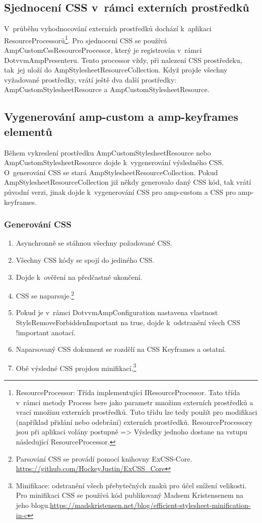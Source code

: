 \subsection*{Sjednocení CSS v~rámci externích prostředků}
V~průběhu vyhodnocování externích prostředků dochází k~aplikaci ResourceProcessorů\footnote{ResourceProcessor: Třída implementující IResourceProcessor. Tato třída v~rámci metody Process bere jako parametr množinu externích prostředků a vrací množinu externích prostředků. Tuto třídu lze tedy použít pro modifikaci (například přidání nebo odebrání) externích prostředků. ResourceProcessory jsou při aplikaci volány postupně => Výsledky jednoho dostane na vstupu následující ResourceProcessor.}. Pro sjednocení CSS se používá AmpCustomCssResourceProcessor, který je registrován v~rámci DotvvmAmpPresenteru. Tento processor vždy, při nalezení CSS prostředeku, tak~jej uloží do AmpStylesheetResourceCollection. Když projde všechny vyžadované prostředky, vrátí ještě dva další prostředky: AmpCustomStylesheetResource a AmpCustomStylesheetResource.

\subsection*{Vygenerování amp-custom a amp-keyframes elementů}
Během vykreslení prostředku AmpCustomStylesheetResource nebo AmpCustomStylesheetResource dojde k~vygenerování výsledného CSS. O~generování CSS se stará AmpStylesheetResourceCollection. Pokud AmpStylesheetResourceCollection již někdy generovalo daný CSS kód, tak vrátí původní verzi, jinak dojde k~vygenerování CSS pro amp-custom a CSS  pro amp-keyframes.

\subsubsection*{Generování CSS}
\begin{enumerate}
  \setlength{\itemsep}{14pt}%
    \item Asynchronně se stáhnou všechny požadované CSS.
    \item Všechny CSS kódy se spojí do jediného CSS.
    \item Dojde k~ověření na předčastné ukončení.
    \item CSS se naparsuje.\footnote{Parsování CSS se provádí pomocí knihovny ExCSS-Core. \newline \url{https://github.com/HockeyJustin/ExCSS_Core}}
    \item Pokud je v~rámci DotvvmAmpConfiguration nastavena vlastnost StyleRemoveForbiddenImportant na true, dojde k~odstranění všech CSS !important anotací. 
    \item Naparsovaný CSS dokument se rozdělí na CSS Keyframes a ostatní.
    \item Obě výsledné CSS projdou minifikací.\footnote{Minifikace: odstranění všech přebytečných znaků pro účel snížení velikosti. \newline Pro minifikaci CSS se používá kód publikovaný Madsem Kristensenem na jeho blogu.\newline \url{https://madskristensen.net/blog/efficient-stylesheet-minification-in-c}}
\end{enumerate}

